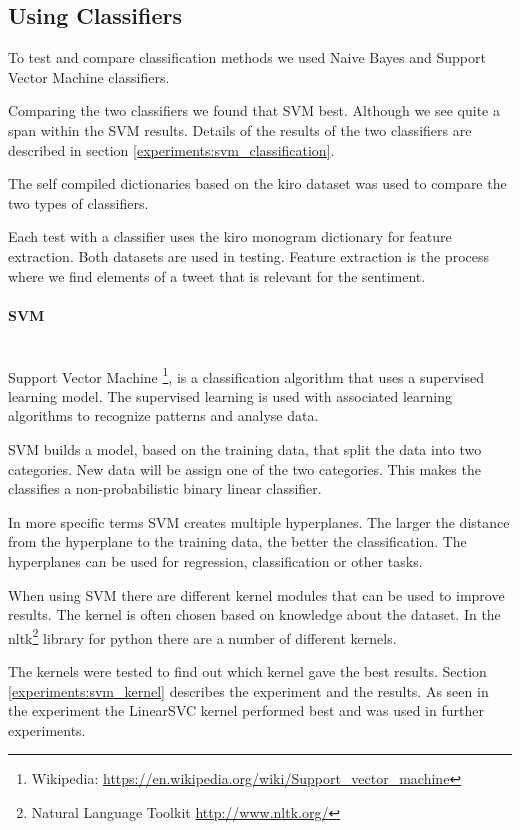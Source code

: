 \subsection{Using Classifiers}\label{sentiment:classifier_classification}
To test and compare classification methods we used Naive Bayes and
Support Vector Machine classifiers. 

Comparing the two classifiers we found that SVM best. Although we see quite a
span within the SVM results. Details of the results of the two classifiers are
described in section \ref{experiments:svm_classification}. 

The self compiled dictionaries based on the kiro dataset was used to compare
the two types of classifiers. 

Each test with a classifier uses the kiro monogram dictionary for feature
extraction. Both datasets are used in testing.
Feature extraction is the process where we find elements of a tweet that is
relevant for the sentiment.  

\paragraph{SVM}\label{sentiment:svm_classification}
\hspace{0pt}\\
Support Vector Machine \footnote{Wikipedia:
\url{https://en.wikipedia.org/wiki/Support_vector_machine}}, is a classification
algorithm that uses a supervised learning model. The supervised learning is used
with associated learning algorithms to recognize patterns and analyse data. 

SVM builds a model, based on the training data, that split the data into two
categories. New data will be assign one of the two categories. This makes the
classifies a non-probabilistic binary linear classifier. 

In more specific terms SVM creates multiple hyperplanes. The larger the
distance from the hyperplane to the training data, the better the
classification. The hyperplanes can be used for regression, classification or
other tasks. 

When using SVM there are different kernel modules that can be used
to improve results. The kernel is often chosen based on knowledge about the
dataset. In the nltk\footnote{Natural Language Toolkit
\url{http://www.nltk.org/}} library for python there are a number of different
kernels. 

The kernels were tested to find out which kernel gave the best results. Section
\ref{experiments:svm_kernel} describes the experiment and the results. As
seen in the experiment the LinearSVC kernel performed best and was used in
further experiments.
%

